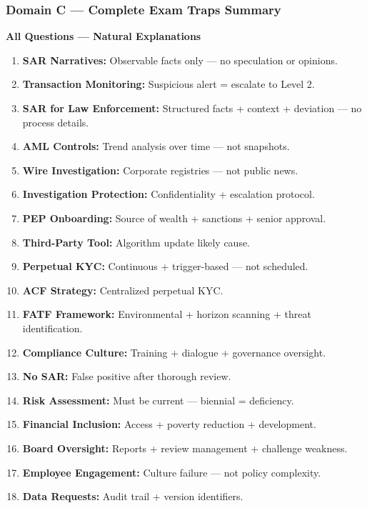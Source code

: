 \documentclass[12pt,aspectratio=169]{beamer}
\renewcommand{\scriptsize}{\fontsize{4.5}{5.5}\selectfont}
\begin{document}
	\begin{frame}
		\frametitle{\fontsize{11}{13}\selectfont \textbf{Domain C — Complete Exam Traps Summary}}
		\scriptsize
		\begin{block}{\fontsize{7}{9}\selectfont \textbf{All Questions — Natural Explanations}}
			\scriptsize
			\begin{enumerate}
				\item \textbf{SAR Narratives:} Observable facts only — no speculation or opinions.
				\item \textbf{Transaction Monitoring:} Suspicious alert = escalate to Level 2.
				\item \textbf{SAR for Law Enforcement:} Structured facts + context + deviation — no process details.
				\item \textbf{AML Controls:} Trend analysis over time — not snapshots.
				\item \textbf{Wire Investigation:} Corporate registries — not public news.
				\item \textbf{Investigation Protection:} Confidentiality + escalation protocol.
				\item \textbf{PEP Onboarding:} Source of wealth + sanctions + senior approval.
				\item \textbf{Third-Party Tool:} Algorithm update likely cause.
				\item \textbf{Perpetual KYC:} Continuous + trigger-based — not scheduled.
				\item \textbf{ACF Strategy:} Centralized perpetual KYC.
				\item \textbf{FATF Framework:} Environmental + horizon scanning + threat identification.
				\item \textbf{Compliance Culture:} Training + dialogue + governance oversight.
				\item \textbf{No SAR:} False positive after thorough review.
				\item \textbf{Risk Assessment:} Must be current — biennial = deficiency.
				\item \textbf{Financial Inclusion:} Access + poverty reduction + development.
				\item \textbf{Board Oversight:} Reports + review management + challenge weakness.
				\item \textbf{Employee Engagement:} Culture failure — not policy complexity.
				\item \textbf{Data Requests:} Audit trail + version identifiers.

\end{enumerate}
\end{block}
\end{frame}
\end{document}
